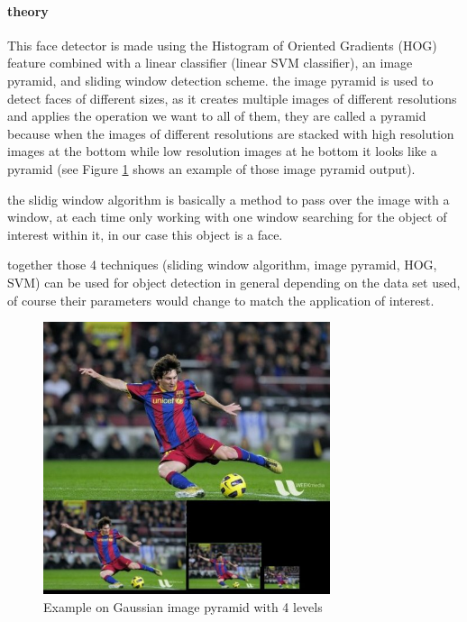 \paragraph{theory}
This face detector is made using the Histogram of Oriented Gradients (HOG) feature combined with a linear classifier (linear SVM classifier), an image pyramid, and sliding window detection scheme.
the image pyramid is used to detect faces of different sizes, as it creates multiple images of different resolutions and applies the operation we want to all of them, they are called a pyramid because when the images of different resolutions are stacked with high resolution images at the bottom while low resolution images at he bottom it looks like a pyramid (see Figure \ref{fig:gaussian_pyramid} shows an example of those image pyramid output).
\newline

the slidig window algorithm is basically a method to pass over the image with a window, at each time only working with one window searching for the object of interest within it, in our case this object is a face.

together those 4 techniques (sliding window algorithm, image pyramid, HOG, SVM) can be used for object detection in general depending on the data set used, of course their parameters would change to match the application of interest.

\begin{figure}
	\centering
	\includegraphics[width=0.75\textwidth]{images/gaussian_pyramid.jpg}
	\caption{Example on Gaussian image pyramid with 4 levels}
	\label{fig:gaussian_pyramid}
\end{figure}

